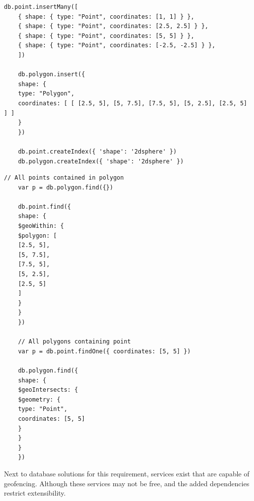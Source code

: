 \begin{multicols}{2}
	\begin{lstlisting}[caption={Select points contained in polygon}, label={lst:sql-pts-in-poly}, belowskip=100pt]
	db.point.insertMany([
	{ shape: { type: "Point", coordinates: [1, 1] } },
	{ shape: { type: "Point", coordinates: [2.5, 2.5] } },
	{ shape: { type: "Point", coordinates: [5, 5] } },
	{ shape: { type: "Point", coordinates: [-2.5, -2.5] } },
	])

	db.polygon.insert({
	shape: {
	type: "Polygon",
	coordinates: [ [ [2.5, 5], [5, 7.5], [7.5, 5], [5, 2.5], [2.5, 5] ] ]
	}
	})

	db.point.createIndex({ 'shape': '2dsphere' })
	db.polygon.createIndex({ 'shape': '2dsphere' })
\end{lstlisting}
	\begin{lstlisting}[caption={Select points contained in polygon}, label={lst:sql-pts-in-poly}, belowskip=0pt]
	// All points contained in polygon
	var p = db.polygon.find({})

	db.point.find({
	shape: {
	$geoWithin: {
	$polygon: [
	[2.5, 5],
	[5, 7.5],
	[7.5, 5],
	[5, 2.5],
	[2.5, 5]
	]
	}
	}
	})

	// All polygons containing point
	var p = db.point.findOne({ coordinates: [5, 5] })

	db.polygon.find({
	shape: {
	$geoIntersects: {
	$geometry: {
	type: "Point",
	coordinates: [5, 5]
	}
	}
	}
	})
\end{lstlisting}
\end{multicols}

Next to database solutions for this requirement, services exist that are capable of geofencing. Although these services may not be free, and the added dependencies restrict extensibility.

%
